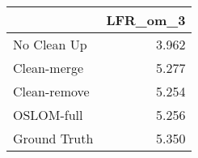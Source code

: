 \begin{tabular}{lr}
\toprule
{} & LFR_om_3 \\
\midrule
No Clean Up  &    3.962 \\
Clean-merge  &    5.277 \\
Clean-remove &    5.254 \\
OSLOM-full   &    5.256 \\
Ground Truth &    5.350 \\
\bottomrule
\end{tabular}
